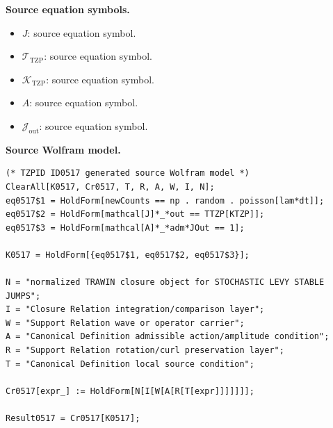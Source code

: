 \begin{minipage}[t]{0.49\linewidth}
\begingroup
\small
\raggedright
\textbf{Source equation symbols.}\par
\begin{itemize}[leftmargin=1.35em,itemsep=1pt,topsep=1pt,parsep=0pt]
    \item $J$: source equation symbol.
    \item $\mathcal{T}_{\mathrm{TZP}}$: source equation symbol.
    \item $\mathcal{K}_{\mathrm{TZP}}$: source equation symbol.
    \item $A$: source equation symbol.
    \item $\mathcal{J}_{\mathrm{out}}$: source equation symbol.
\end{itemize}
\endgroup
\end{minipage}\hfill
\begin{minipage}[t]{0.47\linewidth}
\begingroup
\scriptsize
\raggedright
\textbf{Source Wolfram model.}\par
\begin{Verbatim}[fontsize=\tiny,breaklines=true,breakanywhere=true]
(* TZPID ID0517 generated source Wolfram model *)
ClearAll[K0517, Cr0517, T, R, A, W, I, N];
eq0517$1 = HoldForm[newCounts == np . random . poisson[lam*dt]];
eq0517$2 = HoldForm[mathcal[J]*_*out == TTZP[KTZP]];
eq0517$3 = HoldForm[mathcal[A]*_*adm*JOut == 1];

K0517 = HoldForm[{eq0517$1, eq0517$2, eq0517$3}];

N = "normalized TRAWIN closure object for STOCHASTIC LEVY STABLE JUMPS";
I = "Closure Relation integration/comparison layer";
W = "Support Relation wave or operator carrier";
A = "Canonical Definition admissible action/amplitude condition";
R = "Support Relation rotation/curl preservation layer";
T = "Canonical Definition local source condition";

Cr0517[expr_] := HoldForm[N[I[W[A[R[T[expr]]]]]]];

Result0517 = Cr0517[K0517];
\end{Verbatim}
\endgroup
\end{minipage}

